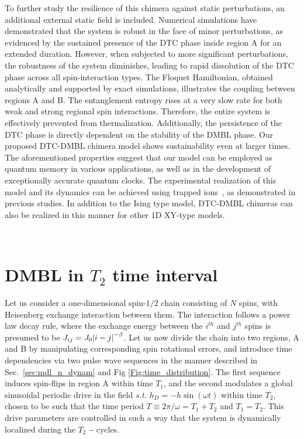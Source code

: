 \documentclass[12pt]{iopart}
\begin{document}
To further study the resilience of this chimera against static perturbations, an additional external static field is included. Numerical simulations have demonstrated that the system is robust in the face of minor perturbations, as evidenced by the sustained presence of the DTC phase inside region A for an extended duration. However, when subjected to more significant perturbations, the robustness of the system diminishes, leading to rapid dissolution of the DTC phase across all spin-interaction types. The Floquet Hamiltonian, obtained analytically and supported by exact simulations, illustrates the coupling between regions A and B. The entanglement entropy rises at a very slow rate for both weak and strong regional spin interactions. Therefore, the entire system is effectively prevented from thermalization. Additionally, the persistence of the DTC phase is directly dependent on the stability of the DMBL phase. Our proposed DTC-DMBL chimera model shows sustainability even at larger times. The aforementioned properties suggest that our model can be employed as quantum memory in various applications, as well as in the development of exceptionally accurate quantum clocks. The experimental realization of this model and its dynamics can be achieved using trapped ions~\cite{sakurai_phys_nodate, Friedenauer2008}, as demonstrated in previous studies. In addition to the Ising type model, DTC-DMBL chimeras can also be realized in this manner for other 1D XY-type models.
	
\medskip
\



\appendix
\section{\label{sec:AppendixA} DMBL in $T_2$ time interval}

Let us consider a one-dimensional spin-$1/2$ chain consisting of $N$ spins, with Heisenberg exchange interaction between them. The interaction follows a power law decay rule, where the exchange energy between the $i^{th}$ and $j^{th}$ spins is presumed to be  $J_{ij}=J_0\abs{i-j}^{-\beta}$. Let us now  divide the chain into two regions, A and B by manipulating corresponding spin rotational errors, and introduce time dependencies via two pulse wave sequences in the manner described in Sec.~\ref{sec:mdl_n_dynam} and Fig \ref{Fig:time_distribution}. The first sequence  induces spin-flips in region A within time $T_1$, and the second modulates a global sinusoidal periodic drive in the field \textit{s.t.} $h_D = -h\sin(\omega t)$ within time $T_2$, chosen to be such that the time period $T\equiv 2\pi/\omega = T_1 + T_2$ and $T_1 = T_2$. This drive parameters are controlled in such a way that the system is dynamically localized during the $T_2-$cycles.
\end{document}
